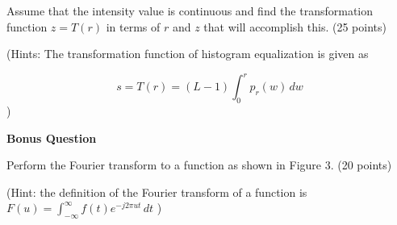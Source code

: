\documentclass[12pt]{article}
\begin{document}
Assume that the intensity value is continuous and find the transformation function $z = T(r)$ in terms of $r$ and $z$ that will accomplish this. (25 points)

\vspace{0.5cm}

(Hints: The transformation function of histogram equalization is given as

\[
s = T(r) = (L-1) \int_0^r p_r(w)\,dw
\]
)

\newpage


\begin{center}
\textbf{Bonus Question}
\end{center}

Perform the Fourier transform to a function as shown in Figure 3. (20 points)

\vspace{0.3cm}

(Hint: the definition of the Fourier transform of a function is $\displaystyle F(u) = \int_{-\infty}^{\infty} f(t) e^{-j2\pi ut}\,dt$ )

\begin{center}
\end{center}

\end{document}
